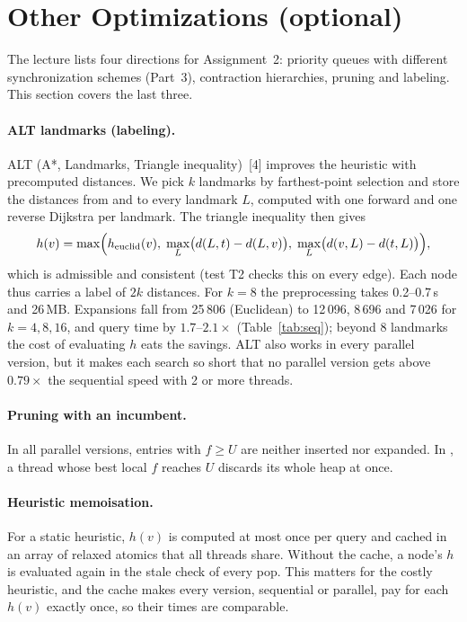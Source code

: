 \section{Other Optimizations (optional)}
\label{sec:opt}

The lecture lists four directions for Assignment~2: priority queues with
different synchronization schemes (Part~3), contraction hierarchies, pruning
and labeling. This section covers the last three.

\paragraph{ALT landmarks (labeling).} ALT (A*, Landmarks, Triangle
inequality)~[4] improves the heuristic with precomputed
distances. We pick $k$ landmarks by farthest-point selection and store the
distances from and to every landmark $L$, computed with one forward and one
reverse Dijkstra per landmark. The triangle inequality then gives
\[
  h(v) = \max\Bigl(h_{\mathrm{euclid}}(v),\;
         \max_L \bigl(d(L,t) - d(L,v)\bigr),\;
         \max_L \bigl(d(v,L) - d(t,L)\bigr)\Bigr),
\]
which is admissible and consistent (test T2 checks this on every edge). Each
node thus carries a label of $2k$ distances. For $k=8$ the preprocessing takes
0.2--0.7\,s and 26\,MB. Expansions fall from 25\,806 (Euclidean) to 12\,096,
8\,696 and 7\,026 for $k = 4, 8, 16$, and query time by $1.7$--$2.1\times$
(Table~\ref{tab:seq}); beyond 8 landmarks the cost of evaluating $h$ eats the
savings. ALT also works in every parallel version, but it makes each search
so short that no parallel version gets above $0.79\times$ the sequential speed
with 2 or more threads.

\paragraph{Pruning with an incumbent.} In all parallel versions, entries with
$f \ge U$ are neither inserted nor expanded. In \HDA{}, a thread whose best
local $f$ reaches $U$ discards its whole heap at once.

\paragraph{Heuristic memoisation.} For a static heuristic, $h(v)$ is computed
at most once per query and cached in an array of relaxed atomics that all
threads share. Without the cache, a node's $h$ is evaluated again in the stale check of
every pop. This matters for the costly heuristic, and the cache makes every
version, sequential or parallel, pay for each $h(v)$ exactly once, so their
times are comparable.

